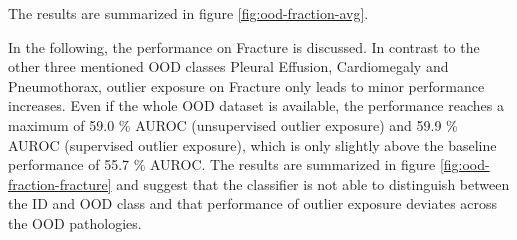 The results are summarized in figure \ref{fig:ood-fraction-avg}.
\par
In the following, the performance on Fracture is discussed.
In contrast to the other three mentioned OOD classes Pleural Effusion, Cardiomegaly and Pneumothorax, outlier exposure on Fracture only leads to minor performance increases.
Even if the whole OOD dataset is available, the performance reaches a maximum of 59.0 \% AUROC (unsupervised outlier exposure) and 59.9 \% AUROC (supervised outlier exposure), which is only slightly above the baseline performance of 55.7 \% AUROC.
The results are summarized in figure \ref{fig:ood-fraction-fracture} and suggest that the classifier is not able to distinguish between the ID and OOD class and that performance of outlier exposure deviates across the OOD pathologies.  